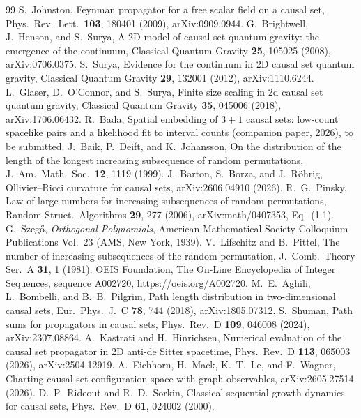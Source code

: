 \documentclass[prd,twocolumn,superscriptaddress,nofootinbib,amsmath,amssymb,floatfix]{revtex4-2}
\begin{document}
\begin{thebibliography}{99}
 S.~Johnston, Feynman propagator for a free scalar field on a causal set, Phys.\ Rev.\ Lett.\ \textbf{103}, 180401 (2009), arXiv:0909.0944.
 G.~Brightwell, J.~Henson, and S.~Surya, A 2D model of causal set quantum gravity: the emergence of the continuum, Classical Quantum Gravity \textbf{25}, 105025 (2008), arXiv:0706.0375.
 S.~Surya, Evidence for the continuum in 2D causal set quantum gravity, Classical Quantum Gravity \textbf{29}, 132001 (2012), arXiv:1110.6244.
 L.~Glaser, D.~O'Connor, and S.~Surya, Finite size scaling in 2d causal set quantum gravity, Classical Quantum Gravity \textbf{35}, 045006 (2018), arXiv:1706.06432.
 R.~Bada, Spatial embedding of $3+1$ causal sets: low-count spacelike pairs and a likelihood fit to interval counts (companion paper, 2026), to be submitted.
 J.~Baik, P.~Deift, and K.~Johansson, On the distribution of the length of the longest increasing subsequence of random permutations, J.\ Am.\ Math.\ Soc.\ \textbf{12}, 1119 (1999).
 J.~Barton, S.~Borza, and J.~R\"ohrig, Ollivier--Ricci curvature for causal sets, arXiv:2606.04910 (2026).
 R.~G.~Pinsky, Law of large numbers for increasing subsequences of random permutations, Random Struct.\ Algorithms \textbf{29}, 277 (2006), arXiv:math/0407353, Eq.~(1.1).
 G.~Szeg\H{o}, \emph{Orthogonal Polynomials}, American Mathematical Society Colloquium Publications Vol.~23 (AMS, New York, 1939).
 V.~Lifschitz and B.~Pittel, The number of increasing subsequences of the random permutation, J.\ Comb.\ Theory Ser.\ A \textbf{31}, 1 (1981).
 OEIS Foundation, The On-Line Encyclopedia of Integer Sequences, sequence A002720, \url{https://oeis.org/A002720}.
 M.~E.~Aghili, L.~Bombelli, and B.~B.~Pilgrim, Path length distribution in two-dimensional causal sets, Eur.\ Phys.\ J.\ C \textbf{78}, 744 (2018), arXiv:1805.07312.
 S.~Shuman, Path sums for propagators in causal sets, Phys.\ Rev.\ D \textbf{109}, 046008 (2024), arXiv:2307.08864.
 A.~Kastrati and H.~Hinrichsen, Numerical evaluation of the causal set propagator in 2D anti-de Sitter spacetime, Phys.\ Rev.\ D \textbf{113}, 065003 (2026), arXiv:2504.12919.
 A.~Eichhorn, H.~Mack, K.~T.~Le, and F.~Wagner, Charting causal set configuration space with graph observables, arXiv:2605.27514 (2026).
 D.~P.~Rideout and R.~D.~Sorkin, Classical sequential growth dynamics for causal sets, Phys.\ Rev.\ D \textbf{61}, 024002 (2000).

\end{thebibliography}
\end{document}
